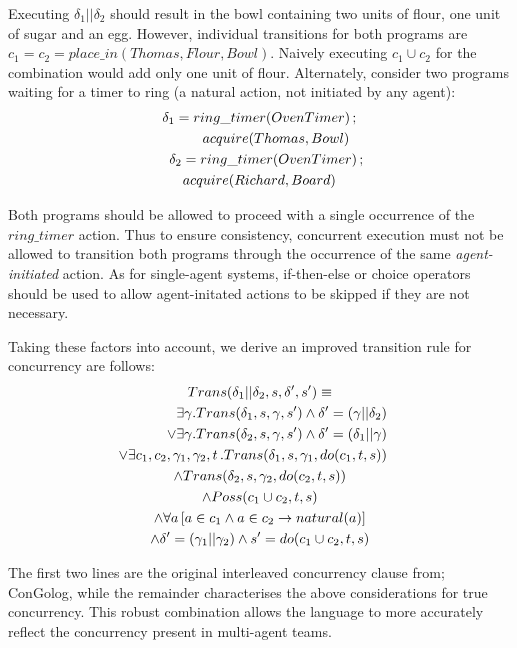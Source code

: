 \documentclass[letterpaper]{article}
\begin{document}
Executing $\delta_{1}||\delta_{2}$ should result in the bowl containing
two units of flour, one unit of sugar and an egg. However, individual
transitions for both programs are $c_{1}=c_{2}=place\_ in(Thomas,Flour,Bowl)$.
Naively executing $c_1 \cup c_2$ for the combination would add only one unit
of flour. Alternately, consider two programs
waiting for a timer to ring (a natural action, not initiated by any agent):
\begin{multline}
\delta_{1}=ring\_ timer(OvenTimer)\,;\\
   \shoveright{acquire(Thomas,Bowl)}\\
\shoveleft{\delta_{2}=ring\_ timer(OvenTimer)\,;}\\
    acquire(Richard,Board)
\end{multline}

Both programs should be allowed to proceed with a single occurrence
of the $ring\_ timer$ action. Thus to ensure consistency, 
concurrent execution must not be allowed
to transition both programs through the occurrence of the same
\emph{agent-initiated} action.  As for single-agent systems, if-then-else or
choice operators should be used to allow agent-initated actions to be
skipped if they are not necessary.

Taking these factors into account, we derive an improved transition
rule for concurrency are follows:
\begin{multline}
\label{eqn:trans_conc_new}
Trans(\delta_{1}||\delta_{2},s,\delta',s')\equiv\\
\shoveright{\exists\gamma. Trans(\delta_{1},s,\gamma,s')\wedge \delta'=(\gamma||\delta_2)}\\
\shoveright{\vee\exists\gamma. Trans(\delta_{2},s,\gamma,s')\wedge \delta'=(\delta_1 || \gamma)}\\
\shoveright{\vee\exists c_{1},c_{2},\gamma_{1},\gamma_{2},t\,.Trans(\delta_{1},s,\gamma_{1},do(c_{1},t,s))}\\
\wedge Trans(\delta_{2},s,\gamma_{2},do(c_{2},t,s))\\
\wedge Poss(c_{1}\cup c_{2},t,s)\\
\wedge\forall a\left[a\in c_{1}\wedge a\in c_{2}\rightarrow natural(a)\right]\\
\wedge\delta'=(\gamma_{1}||\gamma_{2})\wedge s'=do(c_{1}\cup c_{2},t,s)
\end{multline}

The first two lines are the original interleaved concurrency clause from;
ConGolog, while the remainder
characterises the above considerations for true concurrency.
This robust combination allows
the language to more accurately reflect the concurrency present in
multi-agent teams.
\end{document}
